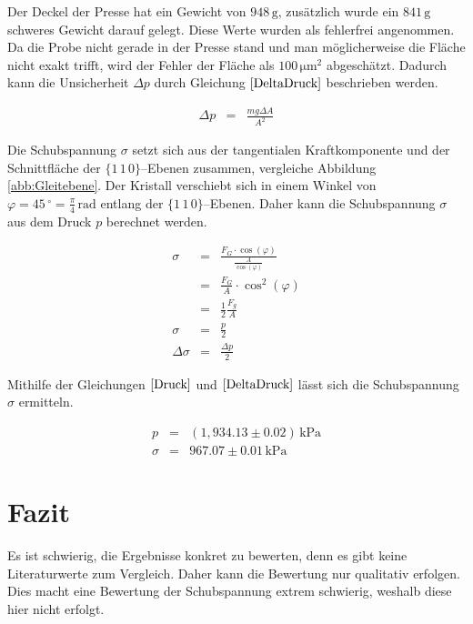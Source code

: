 \documentclass[12pt,a4paper]{scrartcl}
\numberwithin{equation}{section} %
\begin{document}
\noindent
Der Deckel der Presse hat ein Gewicht von $948\mathrm{\,g}$, zusätzlich wurde ein $841\mathrm{\,g}$ schweres Gewicht darauf gelegt. Diese Werte wurden als fehlerfrei angenommen. Da die Probe nicht gerade in der Presse stand und man möglicherweise die Fläche nicht exakt trifft, wird der Fehler der Fläche als $100\mathrm{\,\mu m^2}$ abgeschätzt. Dadurch kann die Unsicherheit $\Delta p$ durch Gleichung $\eqref{DeltaDruck}$ beschrieben werden.

\begin{eqnarray}
    \Delta p &=& \frac{mg \Delta A}{A^2} \label{DeltaDruck}
\end{eqnarray}

\noindent
Die Schubspannung $\sigma$ setzt sich aus der tangentialen Kraftkomponente und der Schnittfläche der $\lbrace1\,1\,0\rbrace$--Ebenen zusammen, vergleiche Abbildung \ref{abb:Gleitebene}. Der Kristall verschiebt sich in einem Winkel von $\varphi=45\,^\circ=\frac{\pi}{4}\mathrm{\,rad}$ entlang der $\lbrace1\,1\,0\rbrace$--Ebenen. Daher kann die Schubspannung $\sigma$ aus dem Druck $p$ berechnet werden.

\begin{eqnarray}
    \sigma &=& \frac{F_G \cdot \cos(\varphi)}{\frac{A}{\cos(\varphi)}}\\
        &=&\frac{F_G}{A} \cdot \cos^2(\varphi) \\
        &=& \frac{1}{2}\frac{F_g}{A}\\
    \sigma &=& \frac{p}{2} \\
    \Delta \sigma &=& \frac{\Delta p}{2}
\end{eqnarray}

\noindent
Mithilfe der Gleichungen $\eqref{Druck}$ und $\eqref{DeltaDruck}$ lässt sich die Schubspannung $\sigma$ ermitteln.

\begin{eqnarray}
    p &=& (1,934.13 \pm 0.02) \mathrm{\,kPa} \\
    \sigma &=& 967.07 \pm 0.01 \mathrm{\,kPa}
\end{eqnarray}

\clearpage
\hypertarget{fazit}{%
\section{Fazit}\label{fazit}}

Es ist schwierig, die Ergebnisse konkret zu bewerten, denn es gibt keine Literaturwerte zum Vergleich. Daher kann die Bewertung nur qualitativ erfolgen. Dies macht eine Bewertung der Schubspannung extrem schwierig, weshalb diese hier nicht erfolgt.
\end{document}
